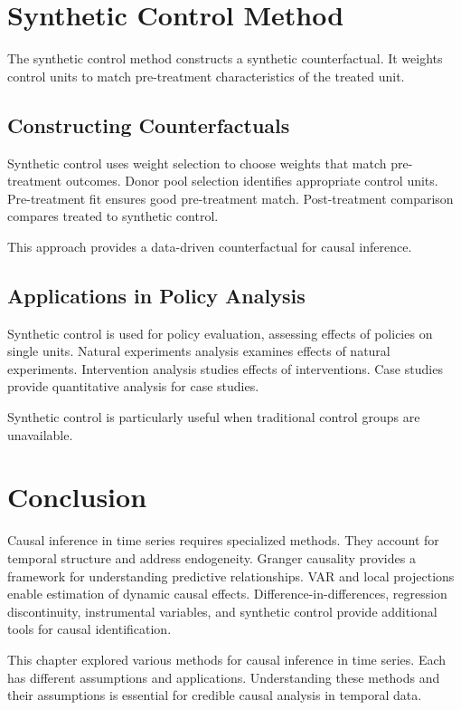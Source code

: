 \section{Synthetic Control Method}

The synthetic control method constructs a synthetic counterfactual. It weights control units to match pre-treatment characteristics of the treated unit.

\subsection{Constructing Counterfactuals}

Synthetic control uses weight selection to choose weights that match pre-treatment outcomes. Donor pool selection identifies appropriate control units. Pre-treatment fit ensures good pre-treatment match. Post-treatment comparison compares treated to synthetic control.

This approach provides a data-driven counterfactual for causal inference.

\subsection{Applications in Policy Analysis}

Synthetic control is used for policy evaluation, assessing effects of policies on single units. Natural experiments analysis examines effects of natural experiments. Intervention analysis studies effects of interventions. Case studies provide quantitative analysis for case studies.

Synthetic control is particularly useful when traditional control groups are unavailable.

\section{Conclusion}

Causal inference in time series requires specialized methods. They account for temporal structure and address endogeneity. Granger causality provides a framework for understanding predictive relationships. VAR and local projections enable estimation of dynamic causal effects. Difference-in-differences, regression discontinuity, instrumental variables, and synthetic control provide additional tools for causal identification.

This chapter explored various methods for causal inference in time series. Each has different assumptions and applications. Understanding these methods and their assumptions is essential for credible causal analysis in temporal data.


